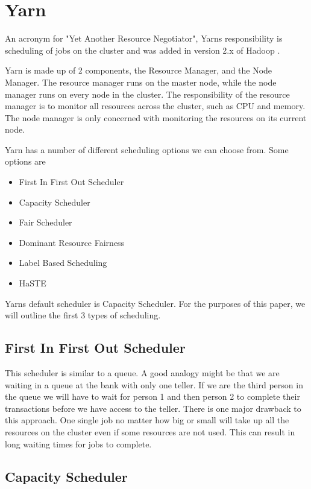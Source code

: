 \section{Yarn}

An acronym for "Yet Another Resource Negotiator", Yarns responsibility is scheduling of jobs on the cluster and was added in version 2.x of Hadoop \cite[pg.1]{yarn-scheduling}.

Yarn is made up of 2 components, the Resource Manager, and the Node Manager. The resource manager runs on the master node, while the node manager runs on every node in the cluster. The responsibility of the resource manager is to monitor all resources across the cluster, such as CPU and memory. The node manager is only concerned with monitoring the resources on its current node.

Yarn has a number of different scheduling options we can choose from. Some options are \cite[pg.2]{yarn-scheduling}

\begin{itemize}
\item First In First Out Scheduler 
\item Capacity Scheduler
\item Fair Scheduler 
\item Dominant Resource Fairness
\item Label Based Scheduling
\item HaSTE
\end{itemize}

Yarns default scheduler is Capacity Scheduler. For the purposes of this paper, we will outline the first 3 types of scheduling.

\subsection{First In First Out Scheduler}

This scheduler is similar to a queue. A good analogy might be that we are waiting in a queue at the bank with only one teller. If we are the third person in the queue we will have to wait for person 1 and then person 2 to complete their transactions before we have access to the teller. 
There is one major drawback to this approach. One single job no matter how big or small will take up all the resources on the cluster even if some resources are not used. This can result in long waiting times for jobs to complete.

\subsection{Capacity Scheduler}

